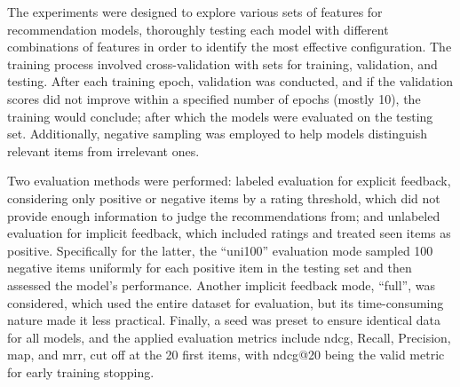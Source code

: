 The experiments were designed to explore various sets of features for recommendation models, thoroughly testing each model with different combinations of features in order to identify the most effective configuration. The training process involved cross-validation with sets for training, validation, and testing. After each training epoch, validation was conducted, and if the validation scores did not improve within a specified number of epochs (mostly 10), the training would conclude; after which the models were evaluated on the testing set. Additionally, negative sampling was employed to help models distinguish relevant items from irrelevant ones.

Two evaluation methods were performed: labeled evaluation for explicit feedback, considering only positive or negative items by a rating threshold, which did not provide enough information to judge the recommendations from; and unlabeled evaluation for implicit feedback, which included ratings and treated seen items as positive. Specifically for the latter, the ``uni100'' evaluation mode sampled 100 negative items uniformly for each positive item in the testing set and then assessed the model's performance. Another implicit feedback mode, ``full'', was considered, which used the entire dataset for evaluation, but its time-consuming nature made it less practical. Finally, a seed was preset to ensure identical data for all models, and the applied evaluation metrics include \acs{ndcg}, Recall, Precision, \acs{map}, and \acs{mrr}, cut off at the 20 first items, with \acs{ndcg}@20 being the valid metric for early training stopping.